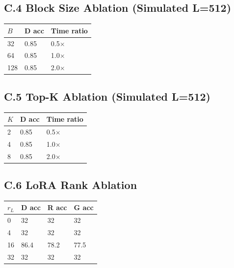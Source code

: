 \subsection{C.4 Block Size Ablation (Simulated L=512)}

\begin{table}[H]
\centering
\small
\begin{tabular}{lll}
\toprule
\textbf{$B$} & \textbf{D acc} & \textbf{Time ratio} \\
\midrule
32 & 0.85 & 0.5$\times$ \\
64 & 0.85 & 1.0$\times$ \\
128 & 0.85 & 2.0$\times$ \\
\bottomrule
\end{tabular}
\end{table}

\subsection{C.5 Top-K Ablation (Simulated L=512)}

\begin{table}[H]
\centering
\small
\begin{tabular}{lll}
\toprule
\textbf{$K$} & \textbf{D acc} & \textbf{Time ratio} \\
\midrule
2 & 0.85 & 0.5$\times$ \\
4 & 0.85 & 1.0$\times$ \\
8 & 0.85 & 2.0$\times$ \\
\bottomrule
\end{tabular}
\end{table}

\subsection{C.6 LoRA Rank Ablation}

\begin{table}[H]
\centering
\small
\begin{tabular}{llll}
\toprule
\textbf{$r_L$} & \textbf{D acc} & \textbf{R acc} & \textbf{G acc} \\
\midrule
0 & 32 & 32 & 32 \\
4 & 32 & 32 & 32 \\
16 & 86.4 & 78.2 & 77.5 \\
32 & 32 & 32 & 32 \\
\bottomrule
\end{tabular}
\end{table}

